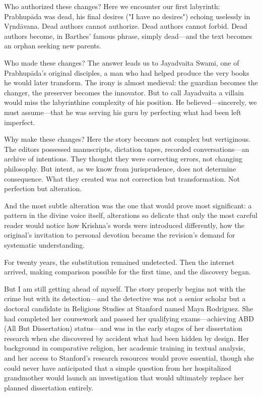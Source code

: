 \documentclass[12pt,twoside]{book}
\begin{document}
Who authorized these changes? Here we encounter our first labyrinth: Prabhupāda was dead, his final desires ("I have no desires") echoing uselessly in Vṛndāvana. Dead authors cannot authorize. Dead authors cannot forbid. Dead authors become, in Barthes' famous phrase, simply dead—and the text becomes an orphan seeking new parents.

Who made these changes? The answer leads us to Jayadvaita Swami, one of Prabhupāda's original disciples, a man who had helped produce the very books he would later transform. The irony is almost medieval: the guardian becomes the changer, the preserver becomes the innovator. But to call Jayadvaita a villain would miss the labyrinthine complexity of his position. He believed—sincerely, we must assume—that he was serving his guru by perfecting what had been left imperfect.

Why make these changes? Here the story becomes not complex but vertiginous. The editors possessed manuscripts, dictation tapes, recorded conversations—an archive of intentions. They thought they were correcting errors, not changing philosophy. But intent, as we know from jurisprudence, does not determine consequence. What they created was not correction but transformation. Not perfection but alteration.

And the most subtle alteration was the one that would prove most significant: a pattern in the divine voice itself, alterations so delicate that only the most careful reader would notice how Krishna's words were introduced differently, how the original's invitation to personal devotion became the revision's demand for systematic understanding.

For twenty years, the substitution remained undetected. Then the internet arrived, making comparison possible for the first time, and the discovery began.

But I am still getting ahead of myself. The story properly begins not with the crime but with its detection—and the detective was not a senior scholar but a doctoral candidate in Religious Studies at Stanford named Maya Rodriguez. She had completed her coursework and passed her qualifying exams—achieving ABD (All But Dissertation) status—and was in the early stages of her dissertation research when she discovered by accident what had been hidden by design. Her background in comparative religion, her academic training in textual analysis, and her access to Stanford's research resources would prove essential, though she could never have anticipated that a simple question from her hospitalized grandmother would launch an investigation that would ultimately replace her planned dissertation entirely.
\end{document}
